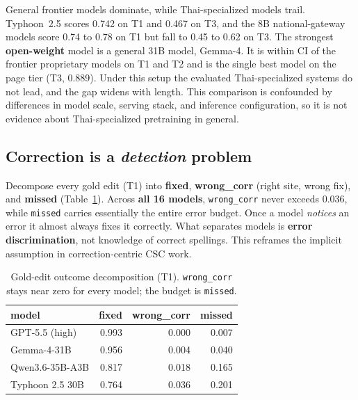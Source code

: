 \documentclass[11pt]{article}
\begin{document}
General frontier models dominate, while Thai-specialized models trail. Typhoon~2.5 scores
0.742 on T1 and 0.467 on T3, and the 8B national-gateway models score 0.74 to 0.78 on T1 but
fall to 0.45 to 0.62 on T3. The strongest \textbf{open-weight} model is a general 31B model,
Gemma-4. It is within CI of the frontier proprietary models on T1 and T2 and is the single
best model on the page tier (T3, 0.889). Under this setup the evaluated Thai-specialized systems
do not lead, and the gap widens with length. This comparison is confounded by differences in
model scale, serving stack, and inference configuration, so it is not evidence about
Thai-specialized pretraining in general.

\subsection{Correction is a \emph{detection} problem}
Decompose every gold edit (T1) into \textbf{fixed}, \textbf{wrong\_corr} (right site, wrong
fix), and \textbf{missed} (Table~\ref{tab:decomp}). Across \textbf{all 16 models},
\texttt{wrong\_corr} never exceeds 0.036, while \texttt{missed} carries essentially the entire
error budget. Once a model \emph{notices} an error it almost always fixes it correctly. What
separates models is \textbf{error discrimination}, not knowledge of correct spellings. This
reframes the implicit assumption in correction-centric CSC work.

\begin{table}[t]
\centering\small
\begin{tabular}{@{}lrrr@{}}
\toprule
model & fixed & wrong\_corr & missed \\
\midrule
GPT-5.5 (high)   & 0.993 & 0.000 & 0.007 \\
Gemma-4-31B      & 0.956 & 0.004 & 0.040 \\
Qwen3.6-35B-A3B  & 0.817 & 0.018 & 0.165 \\
Typhoon 2.5 30B  & 0.764 & 0.036 & 0.201 \\
\bottomrule
\end{tabular}
\caption{Gold-edit outcome decomposition (T1). \texttt{wrong\_corr} stays near zero for every
model; the budget is \texttt{missed}.}
\label{tab:decomp}
\end{table}
\end{document}
